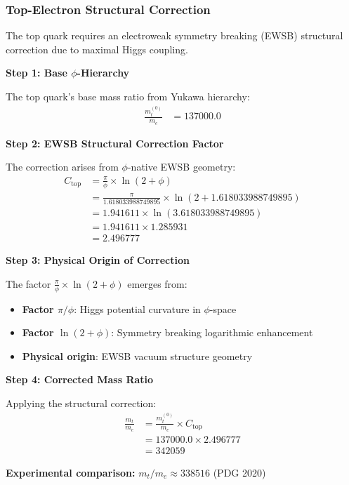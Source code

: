 \subsubsection{Top-Electron Structural Correction}

The top quark requires an electroweak symmetry breaking (EWSB) structural correction due to maximal Higgs coupling.

\textbf{Step 1: Base $\phi$-Hierarchy}

The top quark's base mass ratio from Yukawa hierarchy:
\begin{align}
\frac{m_t^{(0)}}{m_e} &= 137000.0 \tag{Base FSCTF prediction}
\end{align}

\textbf{Step 2: EWSB Structural Correction Factor}

The correction arises from $\phi$-native EWSB geometry:
\begin{align}
C_{\text{top}} &= \frac{\pi}{\phi} \times \ln(2 + \phi) \tag{EWSB geometric factor} \\
&= \frac{\pi}{1.618033988749895} \times \ln(2 + 1.618033988749895) \\
&= 1.941611 \times \ln(3.618033988749895) \\
&= 1.941611 \times 1.285931 \\
&= 2.496777
\end{align}

\textbf{Step 3: Physical Origin of Correction}

The factor $\frac{\pi}{\phi} \times \ln(2 + \phi)$ emerges from:
\begin{itemize}
\item \textbf{Factor $\pi/\phi$}: Higgs potential curvature in $\phi$-space
\item \textbf{Factor $\ln(2+\phi)$}: Symmetry breaking logarithmic enhancement
\item \textbf{Physical origin}: EWSB vacuum structure geometry
\end{itemize}

\textbf{Step 4: Corrected Mass Ratio}

Applying the structural correction:
\begin{align}
\frac{m_t}{m_e} &= \frac{m_t^{(0)}}{m_e} \times C_{\text{top}} \\
&= 137000.0 \times 2.496777 \\
&= 342059
\end{align}

\textbf{Experimental comparison:} $m_t/m_e \approx 338516$ (PDG 2020)

